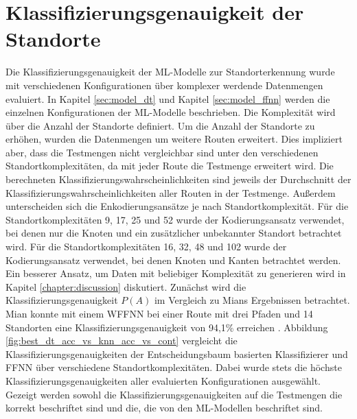 \section{Klassifizierungsgenauigkeit der Standorte}
Die Klassifizierungsgenauigkeit der ML-Modelle zur Standorterkennung wurde mit verschiedenen Konfigurationen über komplexer werdende Datenmengen evaluiert.
In Kapitel \ref{sec:model_dt} und Kapitel \ref{sec:model_ffnn} werden die einzelnen Konfigurationen der ML-Modelle beschrieben.
Die Komplexität wird über die Anzahl der Standorte definiert.
Um die Anzahl der Standorte zu erhöhen, wurden die Datenmengen um weitere Routen erweitert.
Dies impliziert aber, dass die Testmengen nicht vergleichbar sind unter den verschiedenen Standortkomplexitäten, da mit jeder Route die Testmenge erweitert wird.
Die berechneten Klassifizierungswahrscheinlichkeiten sind jeweils der Durchschnitt der Klassifizierungswahrscheinlichkeiten aller Routen in der Testmenge.
\newline
\newline
Außerdem unterscheiden sich die Enkodierungsansätze je nach Standortkomplexität.
Für die Standortkomplexitäten 9, 17, 25 und 52 wurde der Kodierungsansatz verwendet, bei denen nur die Knoten und ein zusätzlicher unbekannter Standort betrachtet wird.
Für die Standortkomplexitäten 16, 32, 48 und 102 wurde der Kodierungsansatz verwendet, bei denen Knoten und Kanten betrachtet werden.
Ein besserer Ansatz, um Daten mit beliebiger Komplexität zu generieren wird in Kapitel \ref{chapter:discussion} diskutiert.
\newline
\newline
Zunächst wird die Klassifizierungsgenauigkeit $P(A)$ im Vergleich zu Mians Ergebnissen betrachtet.
Mian konnte mit einem WFFNN bei einer Route mit drei Pfaden und 14 Standorten eine Klassifizierungsgenauigkeit von 94,1\% erreichen \cite{naveedThesis}.
Abbildung \ref{fig:best_dt_acc_vs_knn_acc_vs_cont} vergleicht die Klassifizierungsgenauigkeiten der
Entscheidungsbaum basierten Klassifizierer und FFNN über verschiedene Standortkomplexitäten.
Dabei wurde stets die höchste Klassifizierungsgenauigkeiten aller evaluierten Konfigurationen ausgewählt.
Gezeigt werden sowohl die Klassifizierungsgenauigkeiten auf die Testmengen die korrekt beschriftet sind und die, die von den ML-Modellen beschriftet sind.
